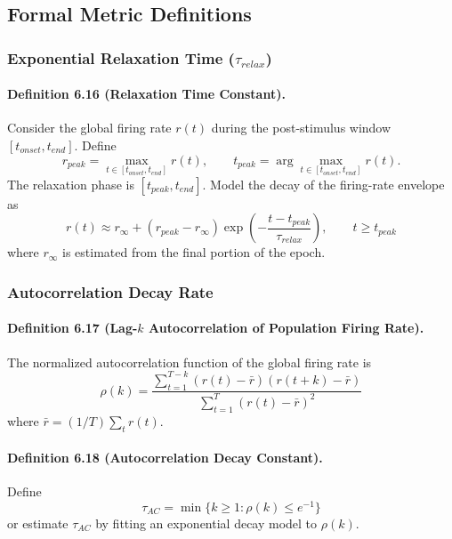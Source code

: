 \subsection{Formal Metric Definitions}

\subsubsection{Exponential Relaxation Time ($\tau_{relax}$)}

\paragraph{Definition 6.16 (Relaxation Time Constant).}
Consider the global firing rate $r(t)$ during the post-stimulus window $[t_{onset},t_{end}]$. Define
\begin{equation}
r_{peak}=\max_{t\in[t_{onset},t_{end}]} r(t), \qquad t_{peak}=\arg\max_{t\in[t_{onset},t_{end}]} r(t).
\end{equation}
The relaxation phase is $[t_{peak},t_{end}]$. Model the decay of the firing-rate envelope as
\begin{equation}
r(t) \approx r_{\infty} + (r_{peak}-r_{\infty})\exp\left(-\frac{t-t_{peak}}{\tau_{relax}}\right), \qquad t\ge t_{peak}
\end{equation}
where $r_{\infty}$ is estimated from the final portion of the epoch.

\subsubsection{Autocorrelation Decay Rate}

\paragraph{Definition 6.17 (Lag-$k$ Autocorrelation of Population Firing Rate).}
The normalized autocorrelation function of the global firing rate is
\begin{equation}
\rho(k)=\frac{\sum_{t=1}^{T-k}(r(t)-\bar{r})(r(t+k)-\bar{r})}{\sum_{t=1}^{T}(r(t)-\bar{r})^2}
\end{equation}
where $\bar{r}=(1/T)\sum_t r(t)$.

\paragraph{Definition 6.18 (Autocorrelation Decay Constant).}
Define
\begin{equation}
\tau_{AC}=\min\{k\ge 1: \rho(k)\le e^{-1}\}
\end{equation}
or estimate $\tau_{AC}$ by fitting an exponential decay model to $\rho(k)$.

